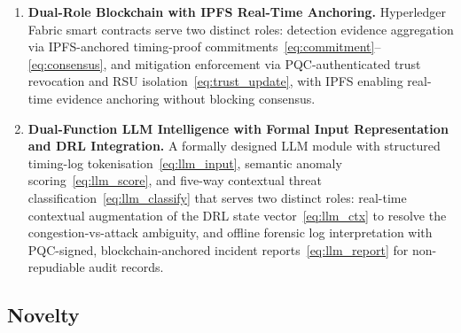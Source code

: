 \begin{enumerate}
\item \textbf{Dual-Role Blockchain with IPFS Real-Time Anchoring.}
Hyperledger Fabric smart contracts serve two distinct roles:
detection evidence aggregation via IPFS-anchored timing-proof
commitments~\eqref{eq:commitment}--\eqref{eq:consensus}, and
mitigation enforcement via PQC-authenticated trust revocation
and RSU isolation~\eqref{eq:trust_update}, with IPFS enabling
real-time evidence anchoring without blocking consensus.

\item \textbf{Dual-Function LLM Intelligence with Formal
Input Representation and DRL Integration.}
A formally designed LLM module with structured timing-log
tokenisation~\eqref{eq:llm_input}, semantic anomaly
scoring~\eqref{eq:llm_score}, and five-way contextual threat
classification~\eqref{eq:llm_classify} that serves two
distinct roles: real-time contextual augmentation of the DRL
state vector~\eqref{eq:llm_ctx} to resolve the congestion-vs-attack
ambiguity, and offline forensic log interpretation with
PQC-signed, blockchain-anchored incident
reports~\eqref{eq:llm_report} for non-repudiable audit records.

\end{enumerate}

\subsection{Novelty}

